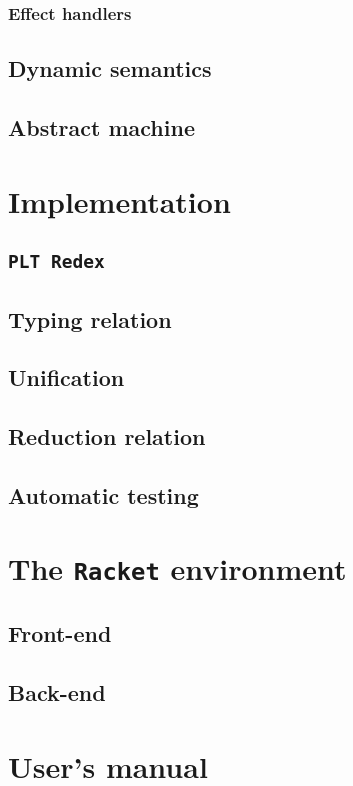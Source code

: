 \documentclass[inz, english, shortabstract]{iithesis}
\newcommand{\Redex}{\texttt{PLT Redex} }
\newcommand{\Racket}{\texttt{Racket} }
\begin{document}
\subsection{Effect handlers}


\section{Dynamic semantics}

\section{Abstract machine}


\chapter{Implementation}\label{ch:implementation}

\section{\Redex}

\section{Typing relation}

\section{Unification}

\section{Reduction relation}

\section{Automatic testing}


\chapter{The \Racket environment}\label{ch:racket}

\section{Front-end}

\section{Back-end}

\chapter{User's manual}\label{ch:manual}

\printbibliography

\end{document}
